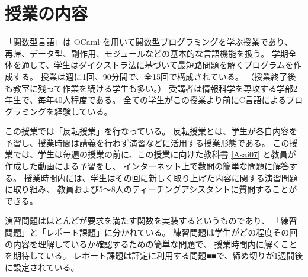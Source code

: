 \section{授業の内容}
\label{section:experiment__course}
「関数型言語」は OCaml を用いて関数型プログラミングを学ぶ授業であり、
再帰、データ型、副作用、モジュールなどの基本的な言語機能を扱う。
学期全体を通して、学生はダイクストラ法に基づいて最短路問題を解くプログラムを作成する。
授業は週に1回、90分間で、全15回で構成されている。
（授業終了後も教室に残って作業を続ける学生も多い。）
受講者は情報科学を専攻する学部2年生で、毎年40人程度である。
全ての学生がこの授業より前にC言語によるプログラミングを経験している。

この授業では「反転授業」を行なっている。
反転授業とは、学生が各自内容を予習し、授業時間は講義を行わず演習などに活用する授業形態である。
この授業では、学生は毎週の授業の前に、この授業に向けた教科書 \ref{Asai07} と教員が作成した動画による予習をし、
インターネット上で数問の簡単な問題に解答する。
授業時間内には、学生はその回に新しく取り上げた内容に関する演習問題に取り組み、
教員および5〜8人のティーチングアシスタントに質問することができる。

演習問題はほとんどが要求を満たす関数を実装するというものであり、
「練習問題」と「レポート課題」に分かれている。
練習問題は学生がどの程度その回の内容を理解しているか確認するための簡単な問題で、
授業時間内に解くことを期待している。
レポート課題は評定に利用する問題■■で、締め切りが1週間後に設定されている。

